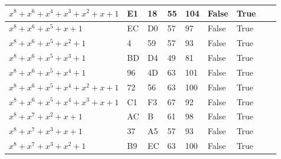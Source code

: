\begin{footnotesize}
\begin{longtable}{|l|l|l|l|l|l|l|l|l|}
$x^8 + x^6 + x^4 + x^3 + x^2 + x + 1$   & E1            & 18                & 55                  & 104                   & False               & True              &              &                                    \\ \hline
$x^8 + x^6 + x^5 + x + 1$               & EC            & D0                & 57                  & 97                    & False               & True              &              &                                    \\ \hline
$x^8 + x^6 + x^5 + x^2 + 1$             & 4             & 59                & 57                  & 93                    & False               & True              &              &                                    \\ \hline
$x^8 + x^6 + x^5 + x^3 + 1$             & BD            & D4                & 49                  & 81                    & False               & True              &              &                                    \\ \hline
$x^8 + x^6 + x^5 + x^4 + 1$             & 96            & 4D                & 63                  & 101                   & False               & True              &              &                                    \\ \hline
$x^8 + x^6 + x^5 + x^4 + x^2 + x + 1$   & 72            & 56                & 63                  & 100                   & False               & True              &              &                                    \\ \hline
$x^8 + x^6 + x^5 + x^4 + x^3 + x + 1$   & C1            & F3                & 67                  & 92                    & False               & True              &              &                                    \\ \hline
$x^8 + x^7 + x^2 + x + 1$               & AC            & B                 & 61                  & 98                    & False               & True              &              &                                    \\ \hline
$x^8 + x^7 + x^3 + x + 1$               & 37            & A5                & 57                  & 93                    & False               & True              &              &                                    \\ \hline
$x^8 + x^7 + x^3 + x^2 + 1$             & B9            & EC                & 63                  & 100                   & False               & True              &              &                                    \\ \hline

\end{longtable}
\end{footnotesize}
